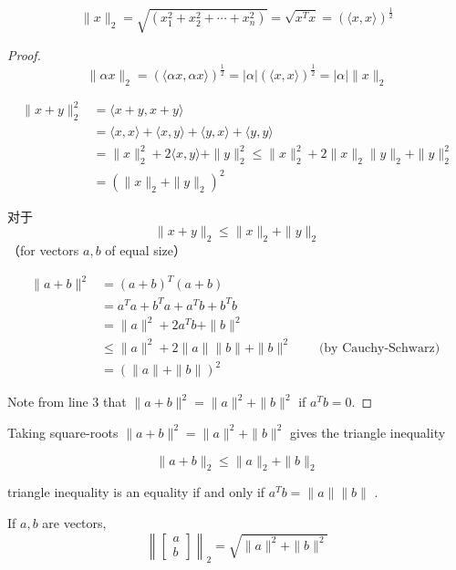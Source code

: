 \begin{example}
    $$ \|x\|_{2}=\sqrt{\left(x_{1}^{2}+x_{2}^{2}+\cdots+x_{n}^{2}\right)}=\sqrt{x^{T} x}=(\langle x, x\rangle)^{\frac{1}{2}} $$
\end{example}

\begin{proof}
    $$ \|\alpha x\|_{2}=(\langle\alpha x, \alpha x\rangle)^{\frac{1}{2}}=|\alpha|(\langle x, x\rangle)^{\frac{1}{2}}=|\alpha|\|x\|_{2} $$
    
    $$\begin{aligned} \|x+y\|_{2}^{2}&=\langle x+y, x+y\rangle 
    \\ &=\langle x, x\rangle+\langle x, y\rangle+\langle y, x\rangle+\langle y, y\rangle  \\
    &=\|x\|_{2}^{2}+2\langle x, y\rangle+\|y\|_{2}^{2} \leq\|x\|_{2}^{2}+2\|x\|_{2}\|y\|_{2}+\|y\|_{2}^{2}\\
    &=\left(\|x\|_{2}+\|y\|_{2}\right)^{2} \end{aligned}$$

    对于$$ \|x+y\|_{2} \leq\|x\|_{2}+\|y\|_{2} $$
    （for vectors $ a, b $ of equal size）

$$ \begin{array}{rlr}\|a+b\|^{2} & =(a+b)^{T}(a+b) & \\ & =a^{T} a+b^{T} a+a^{T} b+b^{T} b & \\ & =\|a\|^{2}+2 a^{T} b+\|b\|^{2} & \\ & \leq\|a\|^{2}+2\|a\|\|b\|+\|b\|^{2} \quad & \text { (by Cauchy-Schwarz) } \\ & =(\|a\|+\|b\|)^{2} & \end{array} $$



Note from line 3 that $ \|a+b\|^{2}=\|a\|^{2}+\|b\|^{2} $ if $ a^{T} b=0 $.
\end{proof}

\begin{corollary}
    Taking square-roots $ \|a+b\|^{2}=\|a\|^{2}+\|b\|^{2} $ gives the triangle inequality

    $$\| a + b \|_2 \le \|a \|_2 + \|b \|_2 $$

triangle inequality is an equality if and only if $ a^{T} b=\|a\|\|b\| $ .
\end{corollary}

\begin{corollary}
    If $ a, b $ are vectors,
$$
\left\|\left[\begin{array}{l}
a \\
b
\end{array}\right]\right\|_2 =\sqrt{\|a\|^{2}+\|b\|^{2}}
$$
\end{corollary}

